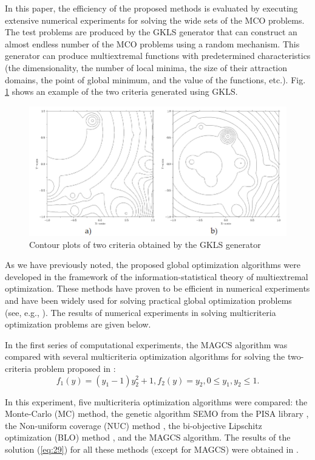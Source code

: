 \documentclass[smallextended]{svjour3}       %
\begin{document}
In this paper, the efficiency of the proposed methods is evaluated by executing extensive numerical experiments for solving the wide sets of the MCO problems. The test problems are produced by the GKLS generator \cite{c37} that can construct an almost endless number of the MCO problems using a random mechanism. This generator can produce multiextremal functions with predetermined characteristics (the dimensionality, the number of local minima, the size of their attraction domains, the point of global minimum, and the value of the functions, etc.). Fig. \ref{fig:3} shows an example of the two criteria generated using GKLS.

\begin{figure}
  \centering
  \includegraphics[width=0.8\linewidth]{fig3}
  \caption{Contour plots of two criteria obtained by the GKLS generator}
  \label{fig:3}
\end{figure}

As we have previously noted, the proposed global optimization algorithms were developed in the framework of the information-statistical theory of multiextremal optimization. These methods have proven to be efficient in numerical experiments and have been widely used for solving practical global optimization problems (see, e.g., \cite{c17,c18,c23,c26,c27,c33,c34}). The results of numerical experiments in solving multicriteria optimization problems are given below.

In the first series of computational experiments, the MAGCS algorithm was compared with several multicriteria optimization algorithms for solving the two-criteria problem proposed in \cite{c35}:
\begin{equation}\label{eq:43}
f_1 (y)=(y_1-1) y_2^2+1,f_2 (y)=y_2, 0\leq y_1,y_2 \leq 1.
\end{equation}

In this experiment, five multicriteria optimization algorithms were compared: the Monte-Carlo (MC) method, the genetic algorithm SEMO from the PISA library \cite{c9,c36}, the Non-uniform coverage (NUC) method \cite{c35}, the bi-objective Lipschitz optimization (BLO) method \cite{c36}, and the MAGCS algorithm. The results of the solution (\ref{eq:29}) for all these methods (except for MAGCS) were obtained in \cite{c36}.
\end{document}
